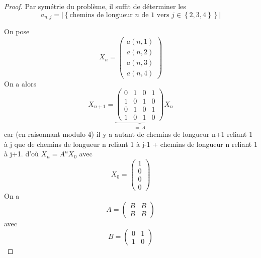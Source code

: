 \documentclass[12pt]{article}
\begin{document}
\begin{proof}
    Par symétrie du problème, il suffit de déterminer les
    \begin{equation}
        a_{n,j}=\left\lvert\left\lbrace\text{chemins de longueur }n\text{ de }1\text{ vers }j\in\left\lbrace2,3,4\right\rbrace\right\rbrace\right\rvert
    \end{equation}

    On pose 
    \begin{equation}
        X_{n}=
        \begin{pmatrix}
            a(n,1)\\
            a(n,2)\\
            a(n,3)\\
            a(n,4)
        \end{pmatrix}
    \end{equation}
    On a alors 
    \begin{equation}
        X_{n+1}=
        \underbrace{
        \begin{pmatrix}
            0 &1 &0 &1\\
            1 &0 &1 &0\\
            0 &1 &0 &1\\
            1 &0 &1 &0
        \end{pmatrix}}_{=~A}
        X_{n}
    \end{equation}
    car (en raisonnant modulo 4) il y a autant de chemins de longueur n+1 reliant 1 à j que de chemins de longueur n reliant 1 à j-1 + chemins de longueur n reliant 1 à j+1.
    d'où $X_{n}=A^{n}X_{0}$ avec 
    \begin{equation}
        X_{0}=
        \begin{pmatrix}
            1\\0\\0\\0
        \end{pmatrix}
    \end{equation}
    On a
    \begin{equation}
        A=
        \begin{pmatrix}
            B&B\\B&B
        \end{pmatrix}
    \end{equation}
    avec
    \begin{equation}
        B=
        \begin{pmatrix}
            0&1\\1&0
        \end{pmatrix}

\end{equation}
\end{proof}
\end{document}
